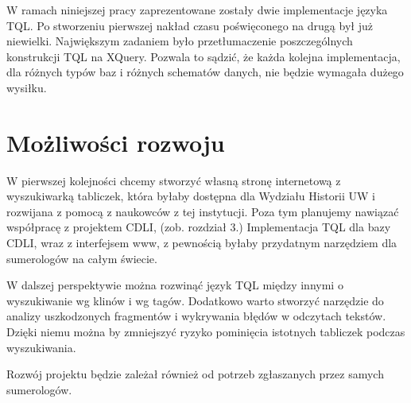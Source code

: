 W ramach niniejszej pracy zaprezentowane zostały dwie implementacje języka TQL. Po stworzeniu pierwszej nakład czasu poświęconego na drugą był już niewielki. Największym zadaniem było przetłumaczenie poszczególnych konstrukcji TQL na XQuery. Pozwala to sądzić, że każda kolejna implementacja, dla różnych typów baz i różnych schematów danych, nie będzie wymagała dużego wysiłku. 



\section*{Możliwości rozwoju}

W pierwszej kolejności chcemy stworzyć własną stronę internetową z wyszukiwarką tabliczek, która byłaby dostępna dla Wydziału Historii UW i rozwijana z pomocą z naukowców z tej instytucji. Poza tym planujemy nawiązać współpracę z projektem CDLI, (zob. rozdział 3.) Implementacja TQL dla bazy CDLI, wraz z interfejsem www, z pewnością byłaby przydatnym narzędziem dla sumerologów na całym świecie.

W dalszej perspektywie można rozwinąć język TQL między innymi o wyszukiwanie wg klinów i wg tagów. Dodatkowo warto stworzyć narzędzie do analizy uszkodzonych fragmentów i wykrywania błędów w odczytach tekstów. Dzięki niemu można by zmniejszyć ryzyko pominięcia istotnych tabliczek podczas wyszukiwania. 

Rozwój projektu będzie zależał również od potrzeb zgłaszanych przez samych sumerologów.







%
%
%
